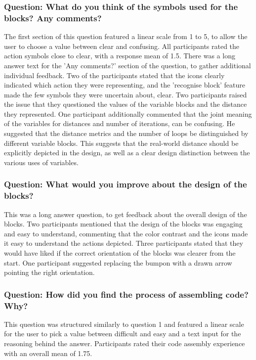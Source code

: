 \documentclass[oneside,%
                    author={Malak Hajji},
                    degree={BSc},
                    title={Designing An Accessible Computational Toolkit For Students},
                  subtitle={With Mixed Visual Abilities}]{dissertation}
\begin{document}
\subsubsection{Question: What do you think of the symbols used for the blocks? Any comments?}
The first section of this question featured a linear scale from 1 to 5, to allow the user to choose a value between clear and confusing. All participants rated the action symbols close to clear, with a response mean of 1.5.
There was a long answer text for the 'Any comments?' section of the question, to gather additional individual feedback. 
Two of the participants stated that the icons clearly indicated which action they were representing, and the 'recognise block' feature made the few symbols they were uncertain about, clear. Two participants raised the issue that they questioned the values of the variable blocks and the distance they represented. One participant additionally commented that the joint meaning of the variables for distances and number of iterations, can be confusing. He suggested that the distance metrics and the number of loops be distinguished by different variable blocks. This suggests that the real-world distance should be explicitly depicted in the design, as well as a clear design distinction between the various uses of variables.


\subsubsection{Question: What would you improve about the design of the blocks?}
This was a long answer question, to get feedback about the overall design of the blocks.
Two participants mentioned that the design of the blocks was engaging and easy to understand, commenting that the color contrast and the icons made it easy to understand the actions depicted. Three participants stated that they would have liked if the correct orientation of the blocks was clearer from the start. One participant suggested replacing the bumpon with a drawn arrow pointing the right orientation. 

\subsubsection{Question: How did you find the process of assembling code? Why?}
This question was structured similarly to question 1 and featured a linear scale for the user to pick a value between difficult and easy and a text input for the reasoning behind the answer. Participants rated their code assembly experience with an overall mean of 1.75.
\end{document}
